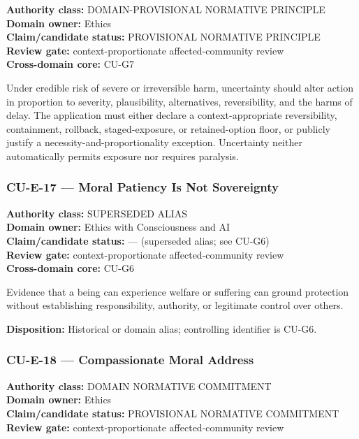 \documentclass[
  11pt,
]{article}
\begin{document}
\textbf{Authority class:} DOMAIN-PROVISIONAL NORMATIVE PRINCIPLE\\
\textbf{Domain owner:} Ethics\\
\textbf{Claim/candidate status:} PROVISIONAL NORMATIVE PRINCIPLE\\
\textbf{Review gate:} context-proportionate affected-community review\\
\textbf{Cross-domain core:} CU-G7

Under credible risk of severe or irreversible harm, uncertainty should
alter action in proportion to severity, plausibility, alternatives,
reversibility, and the harms of delay. The application must either
declare a context-appropriate reversibility, containment, rollback,
staged-exposure, or retained-option floor, or publicly justify a
necessity-and-proportionality exception. Uncertainty neither
automatically permits exposure nor requires paralysis.

\subsubsection{CU-E-17 --- Moral Patiency Is Not
Sovereignty}\label{cu-e-17-moral-patiency-is-not-sovereignty}

\textbf{Authority class:} SUPERSEDED ALIAS\\
\textbf{Domain owner:} Ethics with Consciousness and AI\\
\textbf{Claim/candidate status:} --- (superseded alias; see CU-G6)\\
\textbf{Review gate:} context-proportionate affected-community review\\
\textbf{Cross-domain core:} CU-G6

Evidence that a being can experience welfare or suffering can ground
protection without establishing responsibility, authority, or legitimate
control over others.

\textbf{Disposition:} Historical or domain alias; controlling identifier
is CU-G6.

\subsubsection{CU-E-18 --- Compassionate Moral
Address}\label{cu-e-18-compassionate-moral-address}

\textbf{Authority class:} DOMAIN NORMATIVE COMMITMENT\\
\textbf{Domain owner:} Ethics\\
\textbf{Claim/candidate status:} PROVISIONAL NORMATIVE COMMITMENT\\
\textbf{Review gate:} context-proportionate affected-community review
\end{document}
